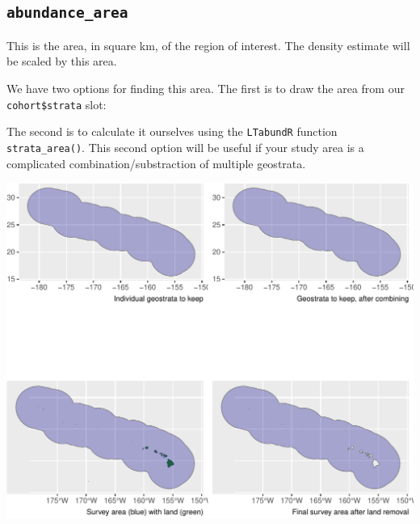 \documentclass[
]{book}
\newenvironment{Shaded}{\begin{snugshade}}{\end{snugshade}}
\newcommand{\AttributeTok}[1]{\textcolor[rgb]{0.77,0.63,0.00}{#1}}
\newcommand{\DecValTok}[1]{\textcolor[rgb]{0.00,0.00,0.81}{#1}}
\newcommand{\FunctionTok}[1]{\textcolor[rgb]{0.00,0.00,0.00}{#1}}
\newcommand{\NormalTok}[1]{#1}
\newcommand{\OtherTok}[1]{\textcolor[rgb]{0.56,0.35,0.01}{#1}}
\newcommand{\SpecialCharTok}[1]{\textcolor[rgb]{0.00,0.00,0.00}{#1}}
\newcommand{\StringTok}[1]{\textcolor[rgb]{0.31,0.60,0.02}{#1}}
\begin{document}
\hypertarget{abundance_area}{%
\subsection*{\texorpdfstring{\texttt{abundance\_area}}{abundance\_area}}\label{abundance_area}}

This is the area, in square km, of the region of interest. The density estimate will be scaled by this area.

We have two options for finding this area. The first is to draw the area from our \texttt{cohort\$strata} slot:

\begin{Shaded}
\end{Shaded}

The second is to calculate it ourselves using the \texttt{LTabundR} function \texttt{strata\_area()}. This second option will be useful if your study area is a complicated combination/substraction of multiple geostrata.

\begin{Shaded}
\end{Shaded}

\includegraphics{figures/unnamed-chunk-296-1.pdf}
\end{document}
